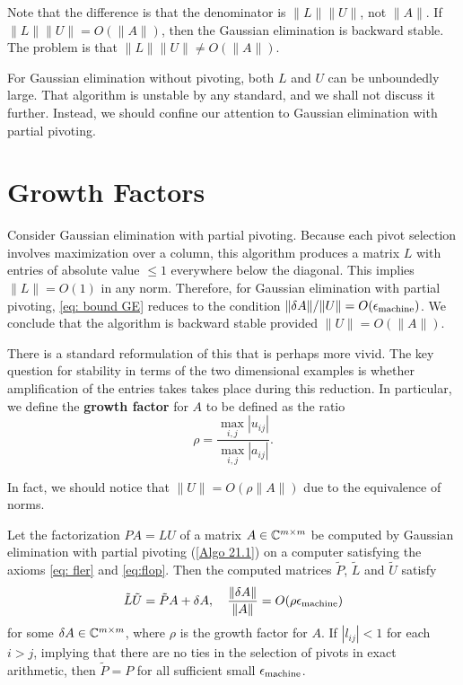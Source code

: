Note that the difference is that the denominator is $\|L\| \|U\|$, not $\|A \|$. If $\|L\|\|U\| = O(\|A\|)$, then the Gaussian elimination is backward stable. The problem is that $ \|L\| \|U\| \neq O(\|A\|) $. 

For Gaussian elimination without pivoting, both $L$ and $U$ can be unboundedly large. That algorithm is unstable by any standard, and we shall not discuss it further. Instead, we should confine our attention to Gaussian elimination with partial pivoting. 

\section{Growth Factors}

Consider Gaussian elimination with partial pivoting. Because each pivot selection involves maximization over a column, this algorithm produces a matrix $L$ with entries of absolute value $ \le 1 $ everywhere below the diagonal. This implies $ \|L\|= O(1) $ in any norm. Therefore, for Gaussian elimination with partial pivoting, \eqref{eq: bound GE} reduces to the condition $ \|\delta A\|/ \|U\| = O(\epsilon_{\text{machine}}) $. We conclude that the algorithm is backward stable provided $ \|U\| = O(\|A\|) $. 

There is a standard reformulation of this that is perhaps more vivid. The key question for stability in terms of the two dimensional examples is whether amplification of the entries takes takes place during this reduction. In particular, we define the \textbf{growth factor} for $A$ to be defined as the ratio 
\begin{equation}
\label{eq: growth factor}
    \rho = \frac{\max_{i,j}|u_{ij}|}{\max_{i,j}|a_{ij}|}. 
\end{equation}

In fact, we should notice that $\|U\| = O(\rho \|A\|)$ due to the equivalence of norms.  


\begin{corollary}
\label{cor: stability}
Let the factorization $PA=LU$ of a matrix $A\in \mathbb{C}^{m\times m}$ be computed by Gaussian elimination with partial pivoting (\autoref{Algo 21.1}) on a computer satisfying the axioms \eqref{eq: fler} and \eqref{eq:flop}. Then the computed matrices $\tilde P$, $\tilde L$ and $\tilde U$ satisfy 
\[
    \tilde L \tilde U = \tilde P A + \delta A, \quad \frac{\|\delta A\|}{\|A\|} = O(\rho \epsilon_{\text{machine}})
\]
for some $\delta A \in \mathbb{C}^{m\times m}$, where $\rho$ is the growth factor for $A$. If $|l_{ij}|<1$ for each $i>j$, implying that there are no ties in the selection of pivots in exact arithmetic, then $\tilde P = P$ for all sufficient small $\epsilon_{\text{machine}}$. 
\end{corollary}


